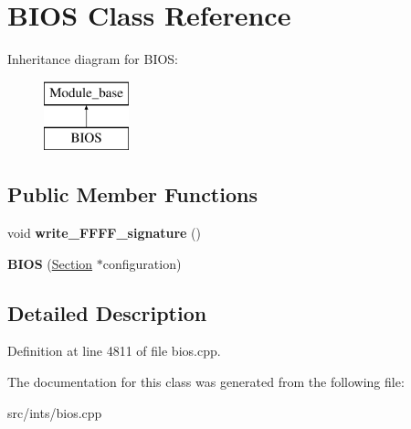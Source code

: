 \hypertarget{classBIOS}{\section{B\-I\-O\-S Class Reference}
\label{classBIOS}
}
Inheritance diagram for B\-I\-O\-S\-:\begin{figure}[H]
\begin{center}
\leavevmode
\includegraphics[height=2.000000cm]{classBIOS}
\end{center}
\end{figure}
\subsection*{Public Member Functions}
\begin{DoxyCompactItemize}
\item 
\hypertarget{classBIOS_ae2cf67c9872366656b32695ce56b3c0a}{void {\bfseries write\-\_\-\-F\-F\-F\-F\-\_\-signature} ()}\label{classBIOS_ae2cf67c9872366656b32695ce56b3c0a}

\item 
\hypertarget{classBIOS_a04ed247011d175b84c556487820fd64c}{{\bfseries B\-I\-O\-S} (\hyperlink{classSection}{Section} $\ast$configuration)}\label{classBIOS_a04ed247011d175b84c556487820fd64c}

\end{DoxyCompactItemize}


\subsection{Detailed Description}


Definition at line 4811 of file bios.\-cpp.



The documentation for this class was generated from the following file\-:\begin{DoxyCompactItemize}
\item 
src/ints/bios.\-cpp\end{DoxyCompactItemize}
